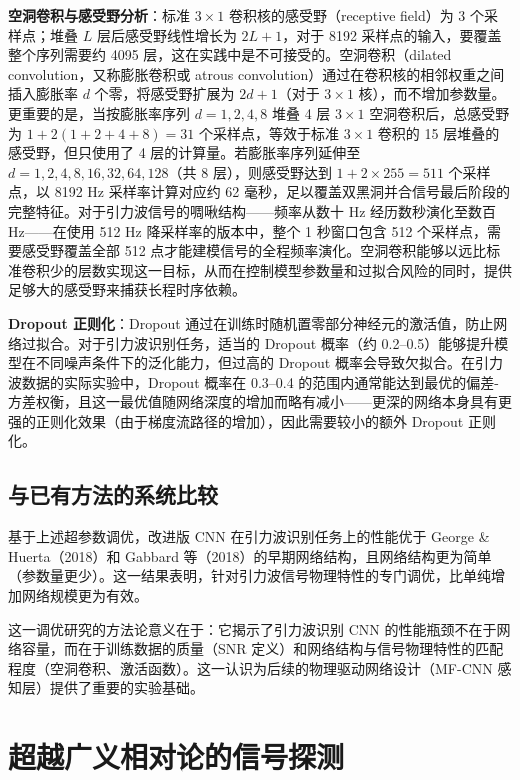 \textbf{空洞卷积与感受野分析}：标准 $3\times 1$ 卷积核的感受野（receptive field）为 3 个采样点；堆叠 $L$ 层后感受野线性增长为 $2L+1$，对于 8192 采样点的输入，要覆盖整个序列需要约 4095 层，这在实践中是不可接受的。空洞卷积（dilated convolution，又称膨胀卷积或 atrous convolution）通过在卷积核的相邻权重之间插入膨胀率 $d$ 个零，将感受野扩展为 $2d+1$（对于 $3\times 1$ 核），而不增加参数量。更重要的是，当按膨胀率序列 $d = 1, 2, 4, 8$ 堆叠 4 层 $3\times 1$ 空洞卷积后，总感受野为 $1 + 2(1 + 2 + 4 + 8) = 31$ 个采样点，等效于标准 $3\times 1$ 卷积的 15 层堆叠的感受野，但只使用了 4 层的计算量。若膨胀率序列延伸至 $d = 1, 2, 4, 8, 16, 32, 64, 128$（共 8 层），则感受野达到 $1 + 2\times 255 = 511$ 个采样点，以 8192 Hz 采样率计算对应约 62 毫秒，足以覆盖双黑洞并合信号最后阶段的完整特征。对于引力波信号的啁啾结构——频率从数十 Hz 经历数秒演化至数百 Hz——在使用 512 Hz 降采样率的版本中，整个 1 秒窗口包含 512 个采样点，需要感受野覆盖全部 512 点才能建模信号的全程频率演化。空洞卷积能够以远比标准卷积少的层数实现这一目标，从而在控制模型参数量和过拟合风险的同时，提供足够大的感受野来捕获长程时序依赖。

\textbf{Dropout 正则化}：Dropout 通过在训练时随机置零部分神经元的激活值，防止网络过拟合。对于引力波识别任务，适当的 Dropout 概率（约 0.2--0.5）能够提升模型在不同噪声条件下的泛化能力，但过高的 Dropout 概率会导致欠拟合。在引力波数据的实际实验中，Dropout 概率在 0.3--0.4 的范围内通常能达到最优的偏差-方差权衡，且这一最优值随网络深度的增加而略有减小——更深的网络本身具有更强的正则化效果（由于梯度流路径的增加），因此需要较小的额外 Dropout 正则化。

\subsection{与已有方法的系统比较}

基于上述超参数调优，改进版 CNN 在引力波识别任务上的性能优于 George \& Huerta（2018）和 Gabbard 等（2018）的早期网络结构，且网络结构更为简单（参数量更少）。这一结果表明，针对引力波信号物理特性的专门调优，比单纯增加网络规模更为有效。

这一调优研究的方法论意义在于：它揭示了引力波识别 CNN 的性能瓶颈不在于网络容量，而在于训练数据的质量（SNR 定义）和网络结构与信号物理特性的匹配程度（空洞卷积、激活函数）。这一认识为后续的物理驱动网络设计（MF-CNN 感知层）提供了重要的实验基础。

\section{超越广义相对论的信号探测}

